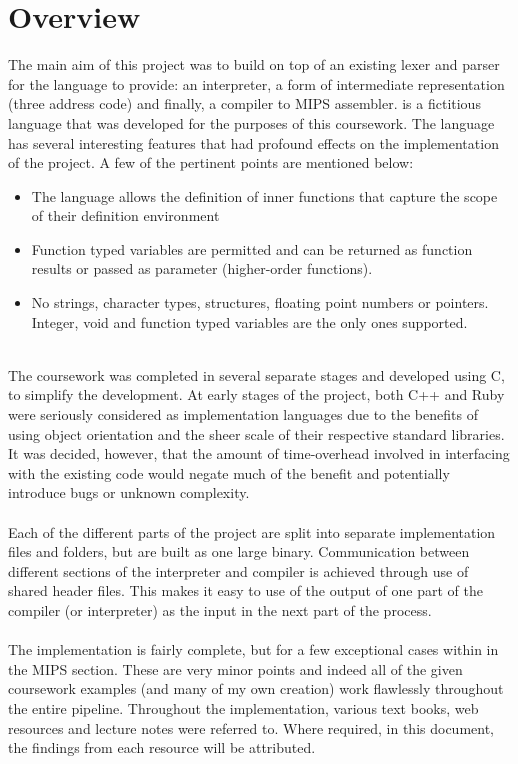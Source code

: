 \chapter{Overview}

The main aim of this project was to build on top of an existing lexer and parser for the \mmc language to provide: an interpreter, a form of intermediate representation (three address code) and finally, a compiler to MIPS assembler. \mmc is a fictitious language that was developed for the purposes of this coursework. The language has several interesting features that had profound effects on the implementation of the project. A few of the pertinent points are mentioned below:

\begin{itemize}
	\item The language allows the definition of inner functions that capture the scope of their definition environment
	\item Function typed variables are permitted and can be returned as function results or passed as parameter (higher-order functions).
	\item No strings, character types, structures, floating point numbers or pointers. Integer, void and function typed variables are the only ones supported.
\end{itemize}
\vspace{-0.25cm}\ \\
The coursework was completed in several separate stages and developed using C, to simplify the development. At early stages of the project, both C++ and Ruby were seriously considered as implementation languages due to the benefits of using object orientation and the sheer scale of their respective standard libraries. It was decided, however, that the amount of time-overhead involved in interfacing with the existing code would negate much of the benefit and potentially introduce bugs or unknown complexity.
\ \\ \ \\
Each of the different parts of the project are split into separate implementation files and folders, but are built as one large binary. Communication between different sections of the interpreter and compiler is achieved through use of shared header files. This makes it easy to use of the output of one part of the compiler (or interpreter) as the input in the next part of the process.
\ \\ \ \\
The implementation is fairly complete, but for a few exceptional cases within in the MIPS section. These are very minor points and indeed all of the given coursework examples (and many of my own creation) work flawlessly throughout the entire pipeline. Throughout the implementation, various text books, web resources and lecture notes were referred to. Where required, in this document, the findings from each resource will be attributed.

